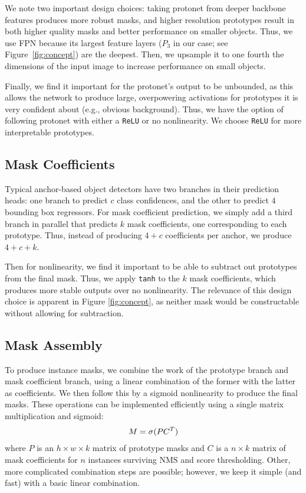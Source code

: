 \documentclass[10pt,journal,compsoc]{IEEEtran}
\begin{document}
We note two important design choices: taking protonet from deeper backbone features produces more robust masks, and higher resolution prototypes result in both higher quality masks and better performance on smaller objects. Thus, we use FPN \cite{fpn} because its largest feature layers ($P_3$ in our case; see Figure~\ref{fig:concept}) are the deepest. Then, we upsample it to one fourth the dimensions of the input image to increase performance on small objects.

    
Finally, we find it important for the protonet's output to be unbounded, as this allows the network to produce large, overpowering activations for prototypes it is very confident about (e.g., obvious background). Thus, we have the option of following protonet with either a {\tt ReLU} or no nonlinearity. We choose {\tt ReLU} for more interpretable prototypes.

\subsection{Mask Coefficients}
Typical anchor-based object detectors have two branches in their prediction heads: one branch to predict $c$ class confidences, and the other to predict $4$ bounding box regressors. For mask coefficient prediction, we simply add a third branch in parallel that predicts $k$ mask coefficients, one corresponding to each prototype. Thus, instead of producing $4 + c$ coefficients per anchor, we produce $4 + c + k$.

Then for nonlinearity, we find it important to be able to subtract out prototypes from the final mask. Thus, we apply {\tt tanh} to the $k$ mask coefficients, which produces more stable outputs over no nonlinearity. The relevance of this design choice is apparent in Figure \ref{fig:concept}, as neither mask would be constructable without allowing for subtraction.


\subsection{Mask Assembly}
To produce instance masks, we combine the work of the prototype branch and mask coefficient branch, using a linear combination of the former with the latter as coefficients. We then follow this by a sigmoid nonlinearity to produce the final masks. These operations can be implemented efficiently using a single matrix multiplication and sigmoid:
    \begin{align} \vspace{-0.3in}
        M = \sigma{(P C^{T})} 
    \vspace{-0.2in} \end{align}
where $P$ is an $h\times w \times k$ matrix of prototype masks and $C$ is a $n \times k$ matrix of mask coefficients for $n$ instances surviving NMS and score thresholding. Other, more complicated combination steps are possible; however, we keep it simple (and fast) with a basic linear combination.
\end{document}
